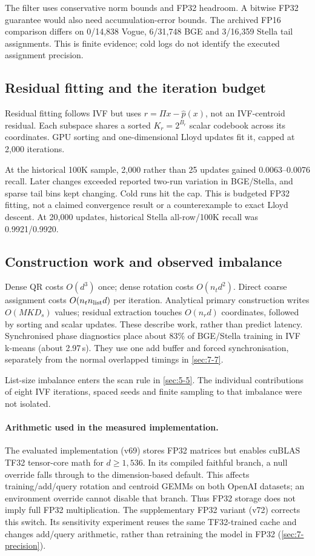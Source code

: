 The filter uses conservative norm bounds and FP32 headroom. A bitwise FP32 guarantee would also need accumulation-error bounds. The archived FP16 comparison differs on 0/14,838 Vogue, 6/31,748 BGE and 3/16,359 Stella tail assignments. This is finite evidence; cold logs do not identify the executed assignment precision.

\subsection{Residual fitting and the iteration budget}

Residual fitting follows IVF but uses $r=\Pi x-\widehat p(x)$, not an IVF-centroid residual. Each subspace shares a sorted $K_r=2^{B_r}$ scalar codebook across its coordinates. GPU sorting and one-dimensional Lloyd updates fit it, capped at 2,000 iterations.

At the historical 100K sample, 2,000 rather than 25 updates gained 0.0063--0.0076 recall. Later changes exceeded reported two-run variation in BGE/Stella, and sparse tail bins kept changing. Cold runs hit the cap. This is budgeted FP32 fitting, not a claimed convergence result or a counterexample to exact Lloyd descent. At 20,000 updates, historical Stella all-row/100K recall was 0.9921/0.9920.

\subsection{Construction work and observed imbalance}

Dense QR costs $O(d^3)$ once; dense rotation costs $O(n_t d^2)$.
Direct coarse assignment costs $O(n_t n_{\rm list}d)$ per iteration.
Analytical primary construction writes $O(MKD_s)$ values; residual
extraction touches $O(n_r d)$ coordinates, followed by sorting and scalar
updates. These describe work, rather than predict latency.
Synchronised phase diagnostics place about 83\% of BGE/Stella training
in IVF k-means (about 2.97\,s). They use one add buffer and forced
synchronisation, separately from the normal overlapped timings in
\cref{sec:7-7}.


List-size imbalance enters the scan rule in \cref{sec:5-5}. The
individual contributions of eight IVF iterations, spaced seeds and
finite sampling to that imbalance were not isolated.


\paragraph{Arithmetic used in the measured implementation.}
The evaluated implementation (v69) stores FP32 matrices but enables cuBLAS
TF32 tensor-core math for $d\geq1{,}536$. In its compiled faithful branch,
a null override falls through to the dimension-based default. This affects
training/add/query rotation and centroid GEMMs on both OpenAI datasets;
an environment override cannot disable that branch. Thus FP32 storage does
not imply full FP32 multiplication. The supplementary FP32 variant (v72)
corrects this switch. Its sensitivity experiment reuses the same
TF32-trained cache and changes add/query arithmetic, rather than retraining
the model in FP32 (\cref{sec:7-precision}).

